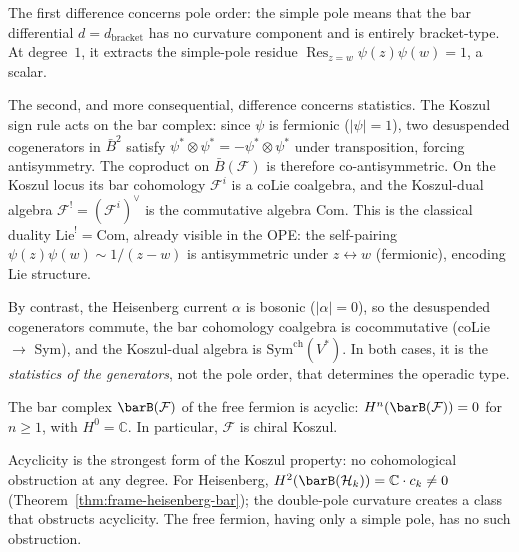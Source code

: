 The first difference concerns pole order: the simple pole means
that the bar differential $d = d_{\mathrm{bracket}}$ has no
curvature component and is entirely bracket-type. At degree~$1$,
it extracts the simple-pole residue
$\operatorname{Res}_{z=w} \psi(z)\psi(w) = 1$, a scalar.

The second, and more consequential, difference concerns statistics.
The Koszul sign rule acts on the bar complex: since $\psi$ is
fermionic ($|\psi| = 1$), two desuspended cogenerators in
$\bar{B}^2$ satisfy
$\psi^* \otimes \psi^* = -\psi^* \otimes \psi^*$ under
transposition, forcing antisymmetry. The coproduct on
$\bar{B}(\mathcal{F})$ is therefore co-antisymmetric. On the
Koszul locus its bar cohomology $\mathcal F^i$ is a coLie
coalgebra, and the Koszul-dual algebra
$\mathcal F^!=(\mathcal F^i)^\vee$ is the commutative algebra
$\mathrm{Com}$. This is the classical duality
$\mathrm{Lie}^! = \mathrm{Com}$, already visible in the OPE:
the self-pairing $\psi(z)\psi(w) \sim 1/(z-w)$ is antisymmetric
under $z \leftrightarrow w$ (fermionic), encoding Lie structure.

By contrast, the Heisenberg current $\alpha$ is bosonic
($|\alpha| = 0$), so the desuspended cogenerators commute, the
bar cohomology coalgebra is cocommutative (coLie $\to$ Sym), and
the Koszul-dual algebra is $\mathrm{Sym}^{\mathrm{ch}}(V^*)$.
In both cases, it is
the \emph{statistics of the generators}, not the pole order, that
determines the operadic type.

\begin{theorem}
\label{thm:frame-fermion-bar}
The bar complex $\barB(\mathcal{F})$ of the free fermion is acyclic:
$H^n(\barB(\mathcal{F})) = 0$ for $n \geq 1$, with
$H^0 = \mathbb{C}$. In particular, $\mathcal{F}$ is chiral Koszul.
\end{theorem}

Acyclicity is the strongest form of the Koszul property: no
cohomological obstruction at any degree. For Heisenberg,
$H^2(\barB(\mathcal{H}_k)) = \mathbb{C} \cdot c_k \neq 0$
(Theorem~\ref{thm:frame-heisenberg-bar}); the double-pole
curvature creates a class that obstructs acyclicity. The free
fermion, having only a simple pole, has no such obstruction.

